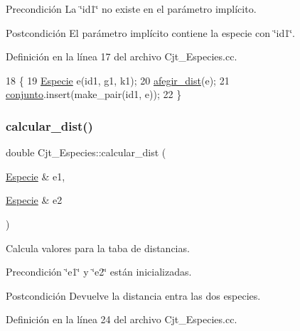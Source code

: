\begin{DoxyPrecond}{Precondición}
La \char`\"{}id1\char`\"{} no existe en el parámetro implícito. 
\end{DoxyPrecond}
\begin{DoxyPostcond}{Postcondición}
El parámetro implícito contiene la especie con \char`\"{}id1\char`\"{}. 
\end{DoxyPostcond}


Definición en la línea 17 del archivo Cjt\+\_\+\+Especies.\+cc.


\begin{DoxyCode}
18 \{   
19     \hyperlink{class_especie}{Especie} e(id1, g1, k1);
20     \hyperlink{class_cjt___especies_afc5f0e3bb5b236081ba71afc3f94df96}{afegir\_dist}(e);
21     \hyperlink{class_cjt___especies_a82ed53cbd620caca3db6b5c20b37a60a}{conjunto}.insert(make\_pair(id1, e));
22 \}
\end{DoxyCode}
\mbox{\label{class_cjt___especies_a318c7df32ed58b513c623668772c3f84}} 
\subsubsection{\texorpdfstring{calcular\+\_\+dist()}{calcular\_dist()}}
{\footnotesize\ttfamily double Cjt\+\_\+\+Especies\+::calcular\+\_\+dist (\begin{DoxyParamCaption}\item[{\hyperlink{class_especie}{Especie} \&}]{e1,  }\item[{\hyperlink{class_especie}{Especie} \&}]{e2 }\end{DoxyParamCaption})}



Calcula valores para la taba de distancias. 

\begin{DoxyPrecond}{Precondición}
\char`\"{}e1\char`\"{} y \char`\"{}e2\char`\"{} están inicializadas. 
\end{DoxyPrecond}
\begin{DoxyPostcond}{Postcondición}
Devuelve la distancia entra las dos especies. 
\end{DoxyPostcond}


Definición en la línea 24 del archivo Cjt\+\_\+\+Especies.\+cc.


